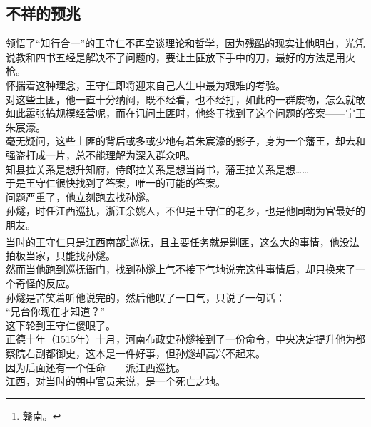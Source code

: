 \begin{multicols}{\theparacolNo}
\subsection{不祥的预兆}
领悟了“知行合一”的王守仁不再空谈理论和哲学，因为残酷的现实让他明白，光凭说教和四书五经是解决不了问题的，要让土匪放下手中的刀，最好的方法是用火枪。\\

怀揣着这种理念，王守仁即将迎来自己人生中最为艰难的考验。\\

对这些土匪，他一直十分纳闷，既不经看，也不经打，如此的一群废物，怎么就敢如此嚣张搞规模经营呢，而在讯问土匪时，他终于找到了这个问题的答案——宁王朱宸濠。\\

毫无疑问，这些土匪的背后或多或少地有着朱宸濠的影子，身为一个藩王，却去和强盗打成一片，总不能理解为深入群众吧。\\

知县拉关系是想升知府，侍郎拉关系是想当尚书，藩王拉关系是想……\\

于是王守仁很快找到了答案，唯一的可能的答案。\\

问题严重了，他立刻跑去找孙燧。\\

孙燧，时任江西巡抚，浙江余姚人，不但是王守仁的老乡，也是他同朝为官最好的朋友。\\

当时的王守仁只是江西南部\footnote{赣南。}巡抚，且主要任务就是剿匪，这么大的事情，他没法拍板当家，只能找孙燧。\\

然而当他跑到巡抚衙门，找到孙燧上气不接下气地说完这件事情后，却只换来了一个奇怪的反应。\\

孙燧是苦笑着听他说完的，然后他叹了一口气，只说了一句话：\\

“兄台你现在才知道？”\\

这下轮到王守仁傻眼了。\\

正德十年（1515年）十月，河南布政史孙燧接到了一份命令，中央决定提升他为都察院右副都御史，这本是一件好事，但孙燧却高兴不起来。\\

因为后面还有一个任命——派江西巡抚。\\

江西，对当时的朝中官员来说，是一个死亡之地。\\


\end{multicols}
